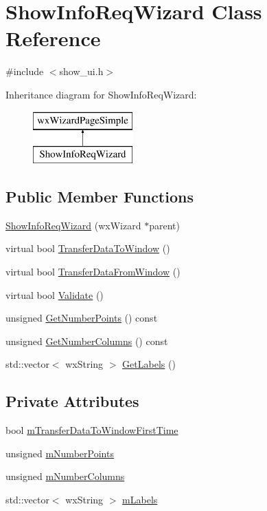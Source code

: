 \hypertarget{a00139}{\section{Show\-Info\-Req\-Wizard Class Reference}
\label{a00139}
}


{\ttfamily \#include $<$show\-\_\-ui.\-h$>$}

Inheritance diagram for Show\-Info\-Req\-Wizard\-:\begin{figure}[H]
\begin{center}
\leavevmode
\includegraphics[height=2.000000cm]{a00139}
\end{center}
\end{figure}
\subsection*{Public Member Functions}
\begin{DoxyCompactItemize}
\item 
\hyperlink{a00139_a444cd89936cc32946207a1d6663d6ce0}{Show\-Info\-Req\-Wizard} (wx\-Wizard $\ast$parent)
\item 
virtual bool \hyperlink{a00139_a7e96035e277faf2cd28010d5d5c7e933}{Transfer\-Data\-To\-Window} ()
\item 
virtual bool \hyperlink{a00139_a25895d194b863f4e6d757783f2caabee}{Transfer\-Data\-From\-Window} ()
\item 
virtual bool \hyperlink{a00139_ab95f735cd6da7cbe5bb37342cd965afe}{Validate} ()
\item 
unsigned \hyperlink{a00139_a0caee257b614c117b579f6d2efeecea1}{Get\-Number\-Points} () const 
\item 
unsigned \hyperlink{a00139_a3fdc022da2dfec9bb7f0740e9af10a48}{Get\-Number\-Columns} () const 
\item 
std\-::vector$<$ wx\-String $>$ \hyperlink{a00139_a1827e59a88c032671743c83b184df21c}{Get\-Labels} ()
\end{DoxyCompactItemize}
\subsection*{Private Attributes}
\begin{DoxyCompactItemize}
\item 
bool \hyperlink{a00139_ab1f4e32591cbd94906d46779540ba905}{m\-Transfer\-Data\-To\-Window\-First\-Time}
\item 
unsigned \hyperlink{a00139_a300e20de94b6e5977875d24198d495ef}{m\-Number\-Points}
\item 
unsigned \hyperlink{a00139_a97eee5905eebb815fc742e9b8835ba9d}{m\-Number\-Columns}
\item 
std\-::vector$<$ wx\-String $>$ \hyperlink{a00139_a4b6e43640c2f5f15f3807813d6d35b91}{m\-Labels}
\end{DoxyCompactItemize}


